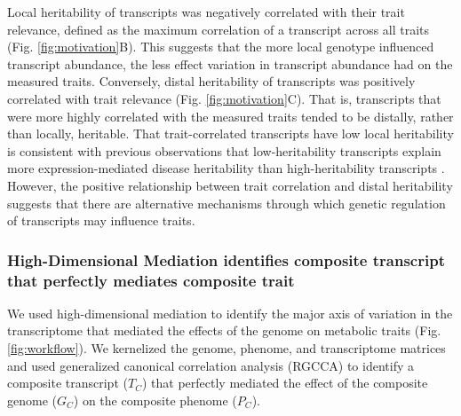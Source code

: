 \documentclass[
]{article}
\begin{document}
Local heritability of transcripts was negatively correlated with their
trait relevance, defined as the maximum correlation of a transcript
across all traits (Fig. \ref{fig:motivation}B). This suggests that the
more local genotype influenced transcript abundance, the less effect
variation in transcript abundance had on the measured traits.
Conversely, distal heritability of transcripts was positively correlated
with trait relevance (Fig. \ref{fig:motivation}C). That is, transcripts
that were more highly correlated with the measured traits tended to be
distally, rather than locally, heritable. That trait-correlated
transcripts have low local heritability is consistent with previous
observations that low-heritability transcripts explain more
expression-mediated disease heritability than high-heritability
transcripts \cite{pmid32424349}. However, the positive relationship
between trait correlation and distal heritability suggests that there
are alternative mechanisms through which genetic regulation of
transcripts may influence traits.

\subsubsection{High-Dimensional Mediation identifies composite
transcript that perfectly mediates composite
trait}\label{high-dimensional-mediation-identifies-composite-transcript-that-perfectly-mediates-composite-trait}

We used high-dimensional mediation to identify the major axis of
variation in the transcriptome that mediated the effects of the genome
on metabolic traits (Fig. \ref{fig:workflow}). We kernelized the genome,
phenome, and transcriptome matrices and used generalized canonical
correlation analysis (RGCCA) \cite{rgcca} to identify a composite
transcript (\(T_C\)) that perfectly mediated the effect of the composite
genome (\(G_C\)) on the composite phenome (\(P_C\)).
\end{document}
